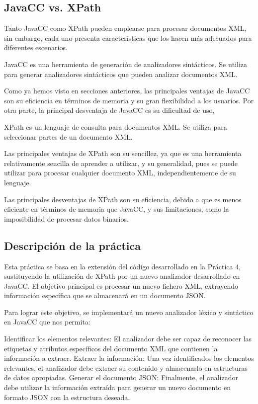 \subsection{JavaCC vs. XPath}

\noindent Tanto JavaCC como XPath pueden emplearse para procesar documentos XML, sin embargo, cada uno presenta características que los hacen más adecuados para diferentes escenarios.

JavaCC es una herramienta de generación de analizadores sintácticos. Se utiliza para generar analizadores sintácticos que pueden analizar documentos XML.

Como ya hemos visto en secciones anteriores, las principales ventajas de JavaCC son su eficiencia en términos de memoria y su gran flexibilidad a los usuarios. Por otra parte, la principal desventaja de JavaCC es su dificultad de uso,

XPath es un lenguaje de consulta para documentos XML. Se utiliza para seleccionar partes de un documento XML.

Las principales ventajas de XPath son su sencillez, ya que es una herramienta relativamente sencilla de aprender a utilizar, y su generalidad, pues se puede utilizar para procesar cualquier documento XML, independientemente de su lenguaje.

Las principales desventajas de XPath son su eficiencia, debido a que es menos eficiente en términos de memoria que JavaCC, y sus limitaciones, como la imposibilidad de procesar datos binarios.


\subsection{Descripción de la práctica}

\noindent Esta práctica se basa en la extensión del código desarrollado en la Práctica 4, sustituyendo la utilización de XPath por un nuevo analizador desarrollado en JavaCC. El objetivo principal es procesar un nuevo fichero XML, extrayendo información específica que se almacenará en un documento JSON.

Para lograr este objetivo, se implementará un nuevo analizador léxico y sintáctico en JavaCC que nos permita:

Identificar los elementos relevantes: El analizador debe ser capaz de reconocer las etiquetas y atributos específicos del documento XML que contienen la información a extraer.
Extraer la información: Una vez identificados los elementos relevantes, el analizador debe extraer su contenido y almacenarlo en estructuras de datos apropiadas.
Generar el documento JSON: Finalmente, el analizador debe utilizar la información extraída para generar un nuevo documento en formato JSON con la estructura deseada.

